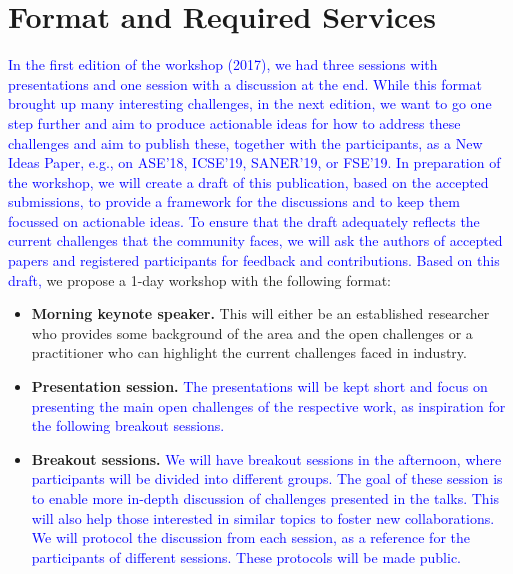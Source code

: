 \documentclass[10pt, conference]{IEEEtran}
\newcommand{\updated}[1]{{\textcolor{blue}{#1}}}
\begin{document}
\section{Format and Required Services}

\updated{In the first edition of the workshop (2017), we had three sessions with presentations and one session with a discussion at the end. While this format brought up many interesting challenges, in the next edition, we want to go one step further and aim to produce actionable ideas for how to address these challenges and aim to publish these, together with the participants, as a New Ideas Paper, e.g., on ASE'18, ICSE'19, SANER'19, or FSE'19. In preparation of the workshop, we will create a draft of this publication, based on the accepted submissions, to provide a framework for the discussions and to keep them focussed on actionable ideas. To ensure that the draft adequately reflects the current challenges that the community faces, we will ask the authors of accepted papers and registered participants for feedback and contributions.
%
Based on this draft,} we propose a 1-day workshop with the following format:

\begin{itemize}
\setlength\itemsep{5pt}
\item \textbf{Morning keynote speaker.} This will either be an established researcher who provides some background of the area and the open challenges or a practitioner who can highlight the current challenges faced in industry.
\item \textbf{Presentation session.} \updated{The presentations will be kept short and focus on presenting the main open challenges of the respective work, as inspiration for the following breakout sessions.}
\item \textbf{Breakout sessions.} \updated{We will have breakout sessions in the afternoon, where participants will be divided into different groups. The goal of these session is to enable more in-depth discussion of challenges presented in the talks. This will also help those interested in similar topics to foster new collaborations. We will protocol the discussion from each session, as a reference for the participants of different sessions. These protocols will be made public.}
\end{itemize}
\end{document}
